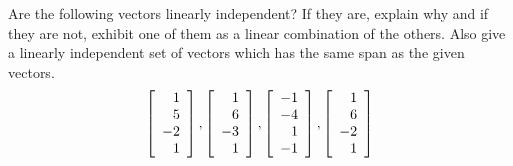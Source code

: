 \begin{enumialphparenastyle}
\begin{ex} Are the following vectors linearly independent? If they are, explain
why and if they are not, exhibit one of them as a linear combination of the
others. Also give a linearly independent set of vectors which has the same
span as the given vectors. 
\begin{equation*}
\left[ 
\begin{array}{r}
1 \\ 
5 \\ 
-2 \\ 
1
\end{array}
\right] ,\left[ 
\begin{array}{r}
1 \\ 
6 \\ 
-3 \\ 
1
\end{array}
\right] ,\left[ 
\begin{array}{r}
-1 \\ 
-4 \\ 
1 \\ 
-1
\end{array}
\right] ,\left[ 
\begin{array}{r}
1 \\ 
6 \\ 
-2 \\ 
1
\end{array}
\right]
\end{equation*}
\end{ex}


\end{enumialphparenastyle}
